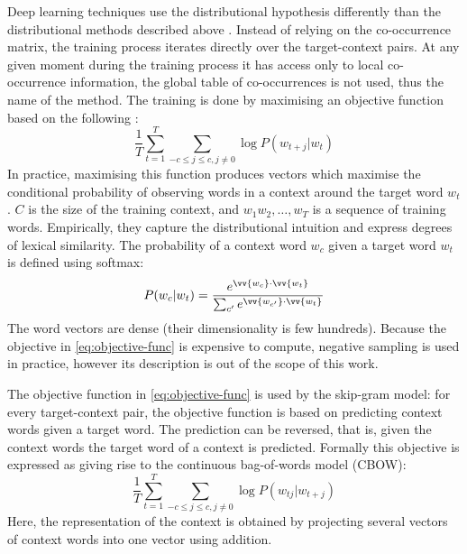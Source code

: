 Deep learning\footnotemark{} techniques use the distributional hypothesis differently than the distributional methods described above \cite{Goldberg2016}. Instead of relying on the co-occurrence matrix, the training process iterates directly over the target-context pairs. At any given moment during the training process it has access only to local co-occurrence information, the global table of co-occurrences is not used, thus the name of the method. The training is done by maximising an objective function based on the following \cite{mikolov2013linguistic,mikolov2013distributed,mikolov2013efficient}:
%
\begin{equation}
 \frac{1}{T}\sum^{T}_{t=1}\sum_{-c \leq j \leq c, j\neq0} \log P(w_{t+j}|w_t)
  \label{eq:objective-func}
\end{equation}
%
In practice, maximising this function produces vectors which maximise the conditional probability of observing words in a context around the target word $w_t$. $C$ is the size of the training context, and $w_1 w_2, \ldots, w_T$ is a sequence of training words. Empirically, they capture the distributional intuition and express degrees of lexical similarity. The probability of a context word $w_c$ given a target word $w_t$ is defined using softmax:
%
\begin{equation*}
  P(w_c|w_{t}) = \frac{e^{\vv{w_c} \cdot \vv{w_t}}}{\sum_{c'}e^{\vv{w_{c'}} \cdot \vv{w_t}}}
\end{equation*}
%
The word vectors are dense (their dimensionality is few hundreds). Because the objective in \eqref{eq:objective-func} is expensive to compute, negative sampling is used in practice, however its description is out of the scope of this work.

The objective function in \eqref{eq:objective-func} is used by the skip-gram model: for every target-context pair, the objective function is based on predicting context words given a target word. The prediction can be reversed, that is, given the context words the target word of a context is predicted. Formally this objective is expressed as \cite{mikolov2013efficient} giving rise to the continuous bag-of-words model (CBOW):
\begin{equation}
 \frac{1}{T}\sum^{T}_{t=1}\sum_{-c \leq j \leq c, j\neq0} \log P(w_{tj}|w_{t+j})
  \label{eq:objective-func-cbow}
\end{equation}
Here, the representation of the context is obtained by projecting several vectors of context words into one vector using addition.


